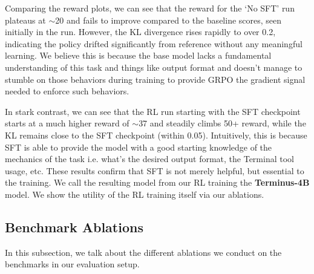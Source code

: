 \documentclass[sigconf,review]{acmart}
\begin{document}
Comparing the reward plots, we can see that the reward for the `No SFT' run plateaus at $\sim$20 and fails to improve compared to the baseline scores, seen initially in the run. However, the KL divergence rises rapidly to over 0.2, indicating the policy drifted significantly from reference without any meaningful learning. We believe this is because the base model lacks a fundamental understanding of this task and things like output format and doesn't manage to stumble on those behaviors during training to provide GRPO the gradient signal needed to enforce such behaviors. 

In stark contrast, we can see that the RL run starting with the SFT checkpoint starts at a much higher reward of $\sim$37 and steadily climbs 50+ reward, while the KL remains close to the SFT checkpoint (within 0.05). Intuitively, this is because SFT is able to provide the model with a good starting knowledge of the mechanics of the task i.e. what's the desired output format, the Terminal tool usage, etc. These results confirm that SFT is not merely helpful, but essential to the training. We call the resulting model from our RL training the \textbf{Terminus-4B} model. We show the utility of the RL training itself via our ablations.

\subsection{Benchmark Ablations}
In this subsection, we talk about the different ablations we conduct on the benchmarks in our evaluation setup.

\end{document}
